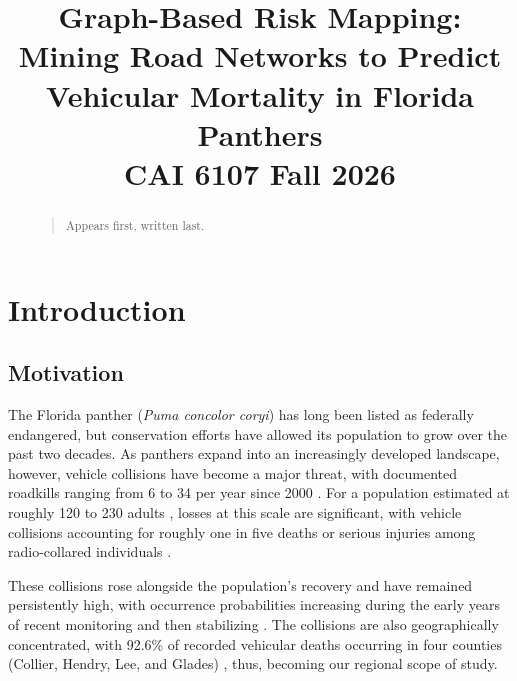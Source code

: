 \documentclass[letterpaper]{article}
\begin{document}
\title{Graph-Based Risk Mapping: Mining Road Networks to Predict Vehicular Mortality in Florida Panthers \\ \vspace{0.15em} \normalsize{CAI 6107 Fall 2026}}

\maketitle
\begin{abstract}
\begin{quote}
Appears first, written last.
\end{quote}
\end{abstract}


\section{Introduction}
\subsection{Motivation}
\noindent The Florida panther (\textit{Puma concolor coryi}) has long been listed as federally endangered, but conservation efforts have allowed its population to grow over the past two decades. As panthers expand into an increasingly developed landscape, however, vehicle collisions have become a major threat, with documented roadkills ranging from 6 to 34 per year since 2000 \cite{fwc2025crossings}. For a population estimated at roughly 120 to 230 adults \cite{fwc2025crossings}, losses at this scale are significant, with vehicle collisions accounting for roughly one in five deaths or serious injuries among radio-collared individuals \cite{PratGuitart2026}.

These collisions rose alongside the population's recovery and have remained persistently high, with occurrence probabilities increasing during the early years of recent monitoring and then stabilizing \cite{PratGuitart2026}. The collisions are also geographically concentrated, with 92.6\% of recorded vehicular deaths occurring in four counties (Collier, Hendry, Lee, and Glades) \cite{FWCPantherMortality}, thus, becoming our regional scope of study.
\end{document}
